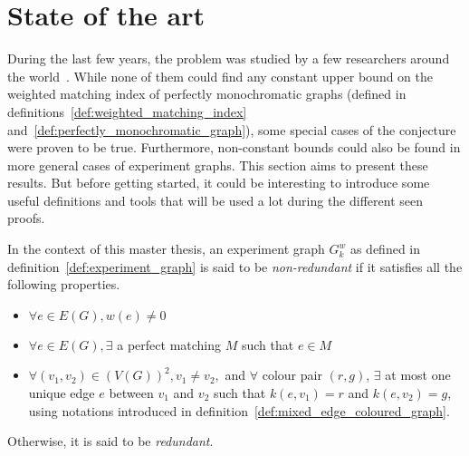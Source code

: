 \chapter{State of the art}
\label{ch:state-of-the-art}

During the last few years, the problem was studied by a few researchers around the world~\cite{Krenn_2017,bogdanov,chandran,chandran2023graphtheoretic}.
While none of them could find any constant upper bound on the weighted matching index of perfectly monochromatic graphs (defined in definitions~\ref{def:weighted_matching_index} and~\ref{def:perfectly_monochromatic_graph}), some special cases of the conjecture were proven to be true.
Furthermore, non-constant bounds could also be found in more general cases of experiment graphs.
This section aims to present these results.
But before getting started, it could be interesting to introduce some useful definitions and tools that will be used a lot during the different seen proofs.

\begin{definition}    %
    \label{def:redundant-experiment-graph}
    In the context of this master thesis, an experiment graph $G_k^w$ as defined in definition~\ref{def:experiment_graph} is said to be \textit{non-redundant} if it satisfies all the following properties.

    \begin{itemize}
        \item $\forall e \in E(G), w(e) \neq 0$
        \item $\forall e \in E(G), \exists$ a perfect matching $M$ such that $e \in M$
        \item $\forall (v_1, v_2) \in (V(G))^2, v_1 \neq v_2,$ and $\forall$ colour pair $(r, g)$, $\exists$ at most one unique edge $e$ between $v_1$ and $v_2$ such that $k(e, v_1) = r$ and $k(e, v_2) = g$, using notations introduced in definition~\ref{def:mixed_edge_coloured_graph}.
    \end{itemize}

    Otherwise, it is said to be \textit{redundant}.
\end{definition}


